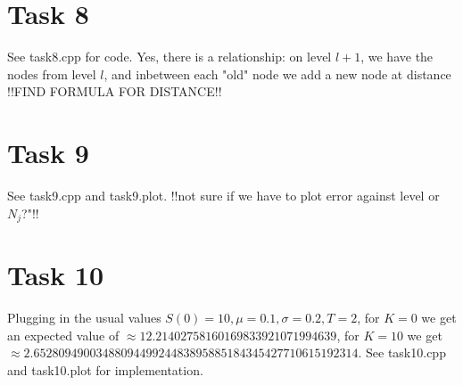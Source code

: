 \documentclass[]{article}
\begin{document}
\section*{Task 8}
See task8.cpp for code. Yes, there is a relationship: on level $l+1$, we have the nodes from level $l$, and inbetween each "old" node we add a new node at distance !!FIND FORMULA FOR DISTANCE!!

\section*{Task 9}
See task9.cpp and task9.plot. !!not sure if we have to plot error against level or $N_j$?"!!

\section*{Task 10}
Plugging in the usual values $S(0)=10,\mu=0.1,\sigma=0.2,T=2$, for $K=0$ we get an expected value of $\approx 12.21402758160169833921071994639$, for $K=10$ we get $\approx 2.6528094900348809449924483895885184345427710615192314$. See task10.cpp and task10.plot for implementation.
\end{document}
